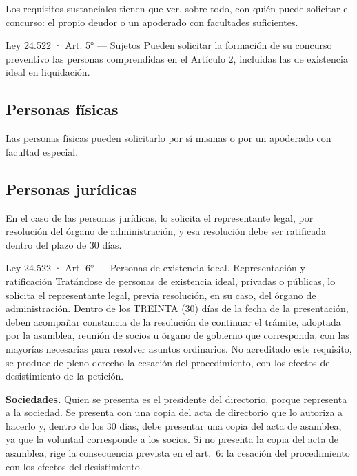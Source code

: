 \documentclass[12pt,oneside]{book}
\begin{document}
Los requisitos sustanciales tienen que ver, sobre todo, con quién puede solicitar el concurso: el propio deudor o un apoderado con facultades suficientes.

\begin{norma}{Ley 24.522 · Art. 5° — Sujetos}
Pueden solicitar la formación de su concurso preventivo las personas comprendidas en el Artículo 2, incluidas las de existencia ideal en liquidación.
\end{norma}

\subsection{Personas físicas}

Las personas físicas pueden solicitarlo por sí mismas o por un apoderado con facultad especial.

\subsection{Personas jurídicas}

En el caso de las personas jurídicas, lo solicita el representante legal, por resolución del órgano de administración, y esa resolución debe ser ratificada dentro del plazo de 30 días.

\begin{norma}{Ley 24.522 · Art. 6° — Personas de existencia ideal. Representación y ratificación}
Tratándose de personas de existencia ideal, privadas o públicas, lo solicita el representante legal, previa resolución, en su caso, del órgano de administración. Dentro de los TREINTA (30) días de la fecha de la presentación, deben acompañar constancia de la resolución de continuar el trámite, adoptada por la asamblea, reunión de socios u órgano de gobierno que corresponda, con las mayorías necesarias para resolver asuntos ordinarios. No acreditado este requisito, se produce de pleno derecho la cesación del procedimiento, con los efectos del desistimiento de la petición.
\end{norma}

\textbf{Sociedades.} Quien se presenta es el presidente del directorio, porque representa a la sociedad. Se presenta con una copia del acta de directorio que lo autoriza a hacerlo y, dentro de los 30 días, debe presentar una copia del acta de asamblea, ya que la voluntad corresponde a los socios. Si no presenta la copia del acta de asamblea, rige la consecuencia prevista en el art.~6: la cesación del procedimiento con los efectos del desistimiento.
\end{document}
